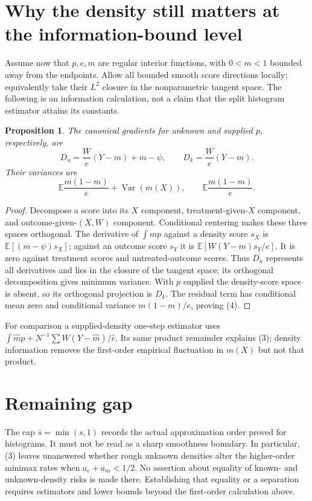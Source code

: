 \documentclass[11pt]{article}
\newtheorem{proposition}[theorem]{Proposition}
\theoremstyle{definition}
\begin{document}
\section*{Why the density still matters at the information-bound level}
Assume now that $p,e,m$ are regular interior functions, with
$0<m<1$ bounded away from the endpoints. Allow all bounded smooth score
directions locally; equivalently take their $L^2$ closure in the
nonparametric tangent space. The following is an information calculation,
not a claim that the split histogram estimator attains its constants.
\begin{proposition}
The canonical gradients for unknown and supplied $p$, respectively, are
\[
 D_u=\frac W e(Y-m)+m-\psi,
 \qquad D_k=\frac W e(Y-m).
\]
Their variances are
\[
 \mathbb E\frac{m(1-m)}e+\operatorname{Var}(m(X)),\qquad
 \mathbb E\frac{m(1-m)}e.                                \tag{4}
\]
\end{proposition}
\begin{proof}
Decompose a score into its $X$ component, treatment-given-$X$ component,
and outcome-given-$(X,W)$ component. Conditional centering makes these
three spaces orthogonal. The derivative of $\int mp$ against a density
score $s_X$ is $\mathbb E[(m-\psi)s_X]$; against an outcome score $s_Y$
it is $\mathbb E[W(Y-m)s_Y/e]$. It is zero against treatment scores and
untreated-outcome scores. Thus $D_u$ represents all derivatives and lies
in the closure of the tangent space; its orthogonal decomposition gives
minimum variance. With $p$ supplied the density-score space is absent,
so its orthogonal projection is $D_k$.
The residual term has conditional mean zero and conditional variance
$m(1-m)/e$, proving (4).
\end{proof}
For comparison a supplied-density one-step estimator uses
$\int\widehat m p+N^{-1}\sum W(Y-\widehat m)/\widehat e$.
Its same product remainder explains (3); density information removes the
first-order empirical fluctuation in $m(X)$ but not that product.

\section*{Remaining gap}
The cap $\bar s=\min(s,1)$ records the actual approximation order proved
for histograms. It must not be read as a sharp smoothness boundary.
In particular, (3) leaves unanswered whether rough unknown densities
alter the higher-order minimax rates when $a_e+a_m<1/2$.
No assertion about equality of known- and unknown-density risks is made
there. Establishing that equality or a separation requires estimators and
lower bounds beyond the first-order calculation above.
\end{document}
